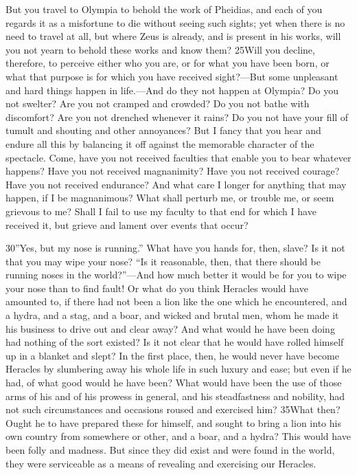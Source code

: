 But you travel to Olympia to behold the work of Pheidias, and each of you regards it as a misfortune to die without seeing such sights; yet when there is no need to travel at all, but where Zeus is already, and is present in his works, will you not yearn to behold these works and know them? 25Will you decline, therefore, to perceive either who you are, or for what you have been born, or what that purpose is for which you have received sight?—But some unpleasant and hard things happen in life.—And do they not happen at Olympia? Do you not swelter? Are you not cramped and crowded? Do you not bathe with discomfort? Are you not drenched whenever it rains? Do you not have your fill of tumult and shouting and other annoyances? But I fancy that you hear and endure all this by balancing it off against the memorable character of the spectacle. Come, have you not received faculties that enable you to bear whatever happens? Have you not received magnanimity? Have you not received courage? Have you not received endurance? And what care I longer for anything that may happen, if I be magnanimous? What shall perturb me, or trouble me, or seem grievous to me? Shall I fail to use my faculty to that end for which I have received it, but grieve and lament over events that occur?

30''Yes, but my nose is running.'' What have you hands for, then, slave? Is it not that you may wipe your nose? ``Is it reasonable, then, that there should be running noses in the world?''—And how much better it would be for you to wipe your nose than to find fault! Or what do you think Heracles would have amounted to, if there had not been a lion like the one which he encountered, and a hydra, and a stag, and a boar, and wicked and brutal men, whom he made it his business to drive out and clear away? And what would he have been doing had nothing of the sort existed? Is it not clear that he would have rolled himself up in a blanket and slept? In the first place, then, he would never have become Heracles by slumbering away his whole life in such luxury and ease; but even if he had, of what good would he have been? What would have been the use of those arms of his and of his prowess in general, and his steadfastness and nobility, had not such circumstances and occasions roused and exercised him? 35What then? Ought he to have prepared these for himself, and sought to bring a lion into his own country from somewhere or other, and a boar, and a hydra? This would have been folly and madness. But since they did exist and were found in the world, they were serviceable as a means of revealing and exercising our Heracles.

